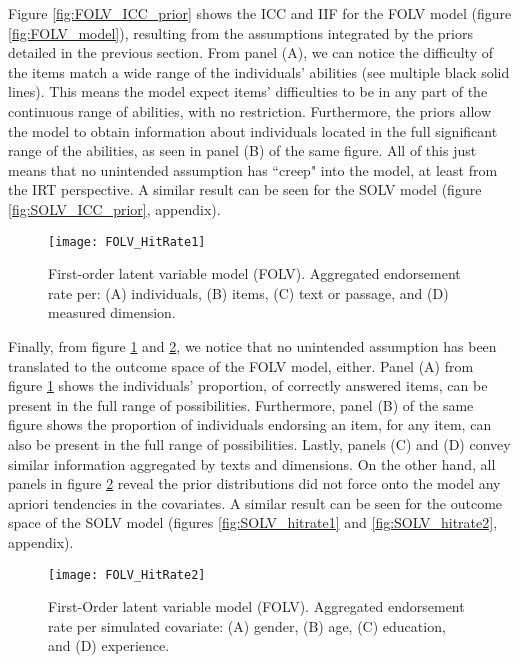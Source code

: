 Figure \ref{fig:FOLV_ICC_prior} shows the ICC and IIF for the FOLV model (figure \ref{fig:FOLV_model}), resulting from the assumptions integrated by the priors detailed in the previous section. From panel (A), we can notice the difficulty of the items match a wide range of the individuals' abilities (see multiple black solid lines). This means the model expect items' difficulties to be in any part of the continuous range of abilities, with no restriction. Furthermore, the priors allow the model to obtain information about individuals located in the full significant range of the abilities, as seen in panel (B) of the same figure. All of this just means that no unintended assumption has ``creep" into the model, at least from the IRT perspective. A similar result can be seen for the SOLV model (figure \ref{fig:SOLV_ICC_prior}, appendix).
%
\begin{figure}[H]
	\centering
	\texttt{[image: FOLV\_HitRate1]}
	\caption[First-order latent variable model (FOLV). Hit rate per dimensions of interest.]%
	{First-order latent variable model (FOLV). Aggregated endorsement rate per: (A) individuals, (B) items, (C) text or passage, and (D) measured dimension.}
	\label{fig:FOLV_hitrate1}
\end{figure}

Finally, from figure \ref{fig:FOLV_hitrate1} and \ref{fig:FOLV_hitrate2}, we notice that no unintended assumption has been translated to the outcome space of the FOLV model, either. Panel (A) from figure \ref{fig:FOLV_hitrate1} shows the individuals'  proportion, of correctly answered items, can be present in the full range of possibilities. Furthermore, panel (B) of the same figure shows the proportion of individuals endorsing an item, for any item, can also be present in the full range of possibilities. Lastly, panels (C) and (D) convey similar information aggregated by texts and dimensions. On the other hand, all panels in figure \ref{fig:FOLV_hitrate2} reveal the prior distributions did not force onto the model any apriori tendencies in the covariates. A similar result can be seen for the outcome space of the SOLV model (figures \ref{fig:SOLV_hitrate1} and \ref{fig:SOLV_hitrate2}, appendix).
%
\begin{figure}[h]
	\centering
	\texttt{[image: FOLV\_HitRate2]}
	\caption[First-Order latent variable model (FOLV). Hit rate per simulated covariate.]%
	{First-Order latent variable model (FOLV). Aggregated endorsement rate per simulated covariate: (A) gender, (B) age, (C) education, and (D) experience.}
	\label{fig:FOLV_hitrate2}
\end{figure}


